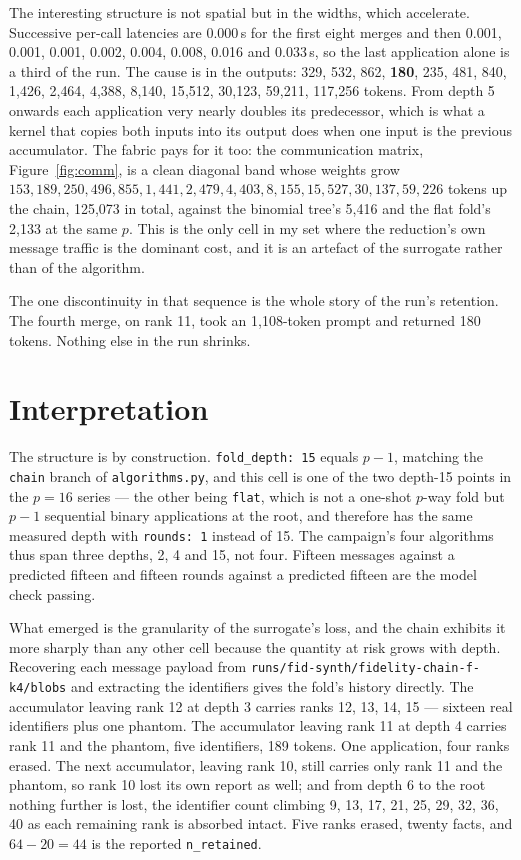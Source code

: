\documentclass[11pt]{article}
\begin{document}
The interesting structure is not spatial but in the widths, which accelerate. Successive
per-call latencies are 0.000\,s for the first eight merges and then 0.001, 0.001, 0.001,
0.002, 0.004, 0.008, 0.016 and 0.033\,s, so the last application alone is a third of the
run. The cause is in the outputs: 329, 532, 862, \textbf{180}, 235, 481, 840, 1{,}426,
2{,}464, 4{,}388, 8{,}140, 15{,}512, 30{,}123, 59{,}211, 117{,}256 tokens. From depth 5
onwards each application very nearly doubles its predecessor, which is what a kernel that
copies both inputs into its output does when one input is the previous accumulator. The
fabric pays for it too: the communication matrix, Figure~\ref{fig:comm}, is a clean
diagonal band whose weights grow $153, 189, 250, 496, 855, 1{,}441, 2{,}479, 4{,}403,
8{,}155, 15{,}527, 30{,}137, 59{,}226$ tokens up the chain, 125{,}073 in total, against the
binomial tree's 5{,}416 and the flat fold's 2{,}133 at the same $p$. This is the only cell
in my set where the reduction's own message traffic is the dominant cost, and it is an
artefact of the surrogate rather than of the algorithm.

The one discontinuity in that sequence is the whole story of the run's retention. The fourth
merge, on rank 11, took an 1{,}108-token prompt and returned 180 tokens. Nothing else in
the run shrinks.

\section{Interpretation}

The structure is by construction. \texttt{fold\_depth: 15} equals $p-1$, matching the
\texttt{chain} branch of \texttt{algorithms.py}, and this cell is one of the two depth-15
points in the $p=16$ series --- the other being \texttt{flat}, which is not a one-shot
$p$-way fold but $p-1$ sequential binary applications at the root, and therefore has the
same measured depth with \texttt{rounds: 1} instead of 15. The campaign's four algorithms
thus span three depths, 2, 4 and 15, not four. Fifteen messages against a predicted fifteen
and fifteen rounds against a predicted fifteen are the model check passing.

What emerged is the granularity of the surrogate's loss, and the chain exhibits it more
sharply than any other cell because the quantity at risk grows with depth. Recovering each
message payload from \texttt{runs/fid-synth/fidelity-chain-f-k4/blobs} and extracting the
identifiers gives the fold's history directly. The accumulator leaving rank 12 at depth 3
carries ranks 12, 13, 14, 15 --- sixteen real identifiers plus one phantom. The accumulator
leaving rank 11 at depth 4 carries rank 11 and the phantom, five identifiers, 189 tokens.
One application, four ranks erased. The next accumulator, leaving rank 10, still carries
only rank 11 and the phantom, so rank 10 lost its own report as well; and from depth 6 to
the root nothing further is lost, the identifier count climbing 9, 13, 17, 21, 25, 29, 32,
36, 40 as each remaining rank is absorbed intact. Five ranks erased, twenty facts, and
$64-20 = 44$ is the reported \texttt{n\_retained}.
\end{document}
